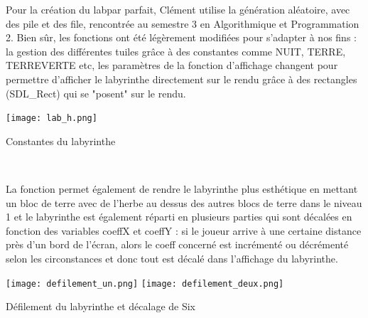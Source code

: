 \documentclass[10pt]{article}
\begin{document}
\begin{center}
   Pour la création du \gls{labpar} parfait, Clément utilise la génération aléatoire, avec des \gls{pile} et des \gls{file}, rencontrée au semestre 3 en Algorithmique et Programmation 2.
   Bien sûr, les fonctions ont été légèrement modifiées pour s'adapter à nos fins : la gestion des différentes tuiles grâce à des \gls{constantes} comme NUIT, TERRE, TERREVERTE etc, les paramètres de la fonction d'affichage changent pour permettre d'afficher le labyrinthe directement sur le \gls{rendu}  grâce à des rectangles (SDL\_Rect) qui se "posent" sur le rendu. 
   \\
    \begin{center}
        \centering
        \texttt{[image: lab\_h.png]}
        \caption{Constantes du labyrinthe}
        \label{fig4}\\
    \end{center}
   La fonction permet également de rendre le labyrinthe plus esthétique en mettant un bloc de terre avec de l'herbe au dessus des autres blocs de terre dans le niveau 1 et le labyrinthe est également réparti en plusieurs parties qui sont décalées en fonction des variables coeffX et coeffY : si le joueur arrive à une certaine distance près d'un bord de l'écran, alors le coeff concerné est incrémenté ou décrémenté selon les circonstances et donc tout est décalé dans l'affichage du labyrinthe.\\
   \begin{center}
        \centering
        \texttt{[image: defilement\_un.png]}
        \texttt{[image: defilement\_deux.png]}
        \caption{Défilement du labyrinthe et décalage de Six}
        \label{fig4}\\
    \end{center}
   
   
   

\end{center}
\end{document}
